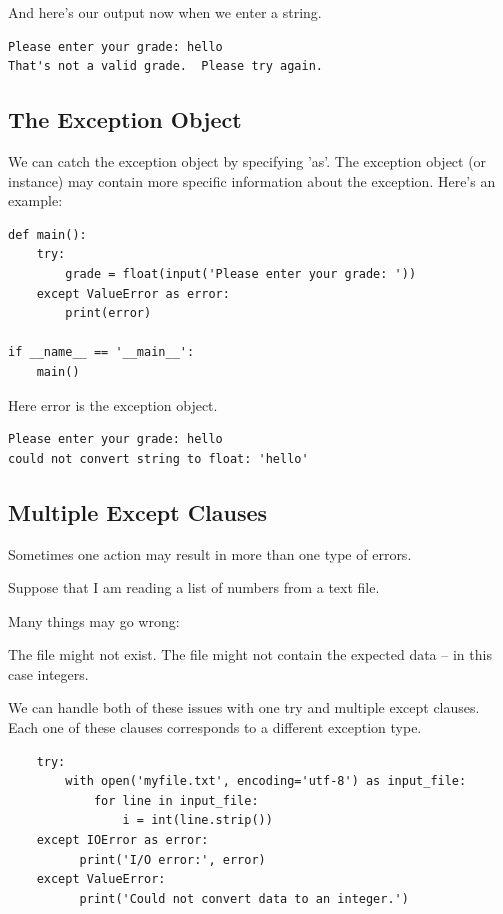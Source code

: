 \documentclass{article}
\begin{document}
And here's our output now when we enter a string.

\begin{lstlisting}
Please enter your grade: hello
That's not a valid grade.  Please try again.
\end{lstlisting}

\subsection{The Exception Object}

We can catch the exception object by specifying 'as'.  The exception object (or instance) may contain more specific information about the exception.  Here's an example: 

\begin{lstlisting}
def main():
    try:
        grade = float(input('Please enter your grade: '))
    except ValueError as error:
        print(error)
 
if __name__ == '__main__':
    main()
\end{lstlisting}

Here error is the exception object. 

\begin{lstlisting}
Please enter your grade: hello
could not convert string to float: 'hello'
\end{lstlisting}

\subsection{Multiple Except Clauses}

Sometimes one action may result in more than one type of errors.

Suppose that I am reading a list of numbers from a text file.

Many things may go wrong:

The file might not exist.
The file might not contain the expected data – in this case integers.

We can handle both of these issues with one try and multiple except clauses.  Each one of these clauses corresponds to a different exception type.

\begin{lstlisting}
    try:
        with open('myfile.txt', encoding='utf-8') as input_file:
            for line in input_file:
                i = int(line.strip())
    except IOError as error:
          print('I/O error:', error)
    except ValueError:
          print('Could not convert data to an integer.')
\end{lstlisting}
\end{document}
